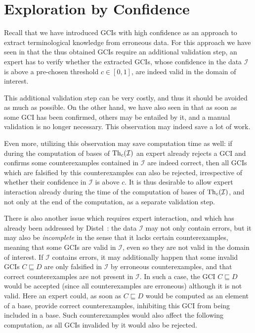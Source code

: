 \chapter{Exploration by Confidence}
\label{cha:expl-conf}

Recall that we have introduced GCIs with high confidence as an approach to extract
terminological knowledge from erroneous data.  For this approach we have seen in
 that the thus obtained GCIs require an additional validation
step, \ie an expert has to verify whether the extracted GCIs, whose confidence in the data
$\mathcal{I}$ is above a pre-chosen threshold $c \in [0,1]$, are indeed valid in the
domain of interest.

This additional validation step can be very costly, and thus it should be avoided as much
as possible.  On the other hand, we have also seen in  that as
soon as some GCI has been confirmed, others may be entailed by it, and a manual validation
is no longer necessary.  This observation may indeed save a lot of work.

Even more, utilizing this observation may save computation time as well: if during the
computation of bases of $\operatorname{Th}_c(\mathcal{I})$ an expert already rejects a GCI and confirms
some counterexamples contained in $\mathcal{I}$ are indeed correct, then all GCIs which
are falsified by this counterexamples can also be rejected, irrespective of whether their
confidence in $\mathcal{I}$ is above $c$.  It is thus desirable to allow expert
interaction already during the time of the computation of bases of $\operatorname{Th}_c(\mathcal{I})$,
and not only at the end of the computation, as a separate validation step.

There is also another issue which requires expert interaction, and which has already been
addressed by Distel~\cite{Diss-Felix}: the data $\mathcal{I}$ may not only contain errors,
but it may also be \emph{incomplete} in the sense that it lacks certain counterexamples,
meaning that some GCIs are valid in $\mathcal{I}$, even so they are not valid in the
domain of interest.  If $\mathcal{I}$ contains errors, it may additionally happen that
some invalid GCIs $C \sqsubseteq D$ are only falsified in $\mathcal{I}$ by erroneous
counterexamples, and that correct counterexamples are not present in $\mathcal{I}$.  In
such a case, the GCI $C \sqsubseteq D$ would be accepted (since all counterexamples are
erroneous) although it is not valid.  Here an expert could, as soon as $C \sqsubseteq D$
would be computed as an element of a base, provide correct counterexamples, inhibiting
this GCI from being included in a base.  Such counterexamples would also affect the
following computation, as all GCIs invalided by it would also be rejected.

